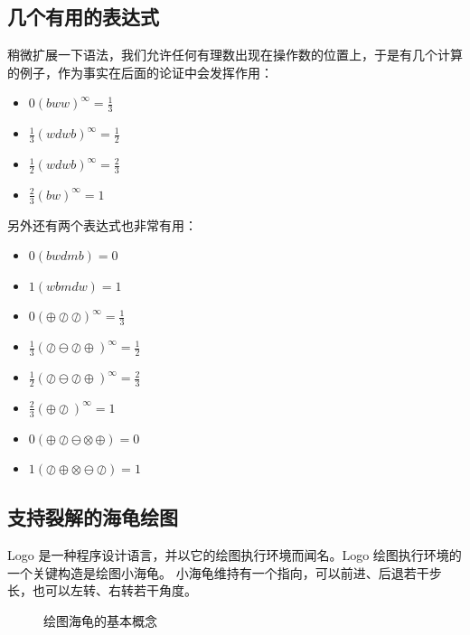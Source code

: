 \documentclass[a4paper,12pt]{article}
\begin{document}
\subsection{几个有用的表达式}

稍微扩展一下语法，我们允许任何有理数出现在操作数的位置上，于是有几个计算的例子，作为事实在后面的论证中会发挥作用：

\begin{itemize}
\item $0(bww)^\infty = \frac{1}{3}$
\item $\frac{1}{3}(wdwb)^\infty = \frac{1}{2}$
\item $\frac{1}{2}(wdwb)^\infty = \frac{2}{3}$
\item $\frac{2}{3}(bw)^\infty = 1$
\end{itemize}

另外还有两个表达式也非常有用：

\begin{itemize}
\item $0(bwdmb) = 0$
\item $1(wbmdw) = 1$
\end{itemize}

\begin{itemize}
\item $0(\oplus \oslash \oslash)^\infty = \frac{1}{3}$
\item $\frac{1}{3}(\oslash \ominus \oslash \oplus)^\infty = \frac{1}{2}$
\item $\frac{1}{2}(\oslash \ominus \oslash \oplus)^\infty = \frac{2}{3}$
\item $\frac{2}{3}(\oplus \oslash)^\infty = 1$
\item $0(\oplus \oslash \ominus \otimes \oplus) = 0$
\item $1(\oslash \oplus \otimes \ominus \oslash) = 1$
\end{itemize}


\subsection{支持裂解的海龟绘图}

Logo 是一种程序设计语言，并以它的绘图执行环境而闻名。Logo 绘图执行环境的一个关键构造是绘图小海龟。
小海龟维持有一个指向，可以前进、后退若干步长，也可以左转、右转若干角度。

\begin{figure}[ht]
\centering
{}
\caption{绘图海龟的基本概念}
\end{figure}
\end{document}
